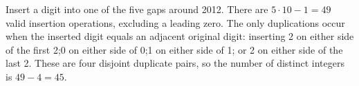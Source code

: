 Insert a digit into one of the five gaps around 2012. There are $5\cdot10-1=49$ valid insertion operations, excluding a leading zero. The only duplications occur when the inserted digit equals an adjacent original digit: inserting 2 on either side of the first 2;0 on either side of 0;1 on either side of 1; or 2 on either side of the last 2. These are four disjoint duplicate pairs, so the number of distinct integers is $49-4=\boxed{45}$.
